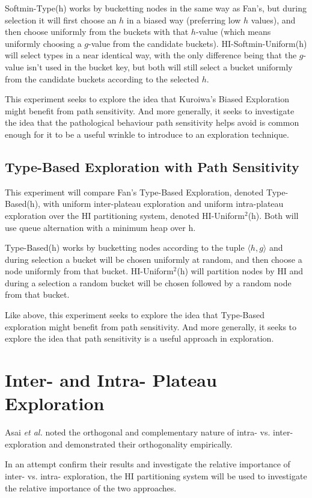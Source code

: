 \documentclass{article}
\theoremstyle{definition}
\begin{document}
Softmin-Type(h) works by bucketting nodes in the same way as Fan's, but during selection it will first choose an $h$ in a biased way (preferring low $h$ values), and then choose uniformly from the buckets with that $h$-value (which means uniformly choosing a $g$-value from the candidate buckets). HI-Softmin-Uniform(h) will select types in a near identical way, with the only difference being that the $g$-value isn't used in the bucket key, but both will still select a bucket uniformly from the candidate buckets according to the selected $h$.

This experiment seeks to explore the idea that Kuroiwa's Biased Exploration might benefit from path sensitivity. And more generally, it seeks to investigate the idea that the pathological behaviour path sensitivity helps avoid is common enough for it to be a useful wrinkle to introduce to an exploration technique.  

\subsection{Type-Based Exploration with Path Sensitivity}
This experiment will compare Fan's Type-Based Exploration, denoted Type-Based(h), with uniform inter-plateau exploration and uniform intra-plateau exploration over the HI partitioning system, denoted HI-Uniform$^2$(h). Both will use queue alternation with a minimum heap over h.  

Type-Based(h) works by bucketting nodes according to the tuple $\langle h, g \rangle$ and during selection a bucket will be chosen uniformly at random, and then choose a node uniformly from that bucket. HI-Uniform$^2$(h) will partition nodes by HI and during a selection a random bucket will be chosen followed by a random node from that bucket.

Like above, this experiment seeks to explore the idea that Type-Based exploration might benefit from path sensitivity. And more generally, it seeks to explore the idea that path sensitivity is a useful approach in exploration.

\section{Inter- and Intra- Plateau Exploration}
Asai \textit{et al.} noted the orthogonal and complementary nature of intra- vs. inter-exploration and demonstrated their orthogonality empirically. 

In an attempt confirm their results and investigate the relative importance of inter- vs. intra- exploration, the HI partitioning system will be used to investigate the relative importance of the two approaches. 
\end{document}
